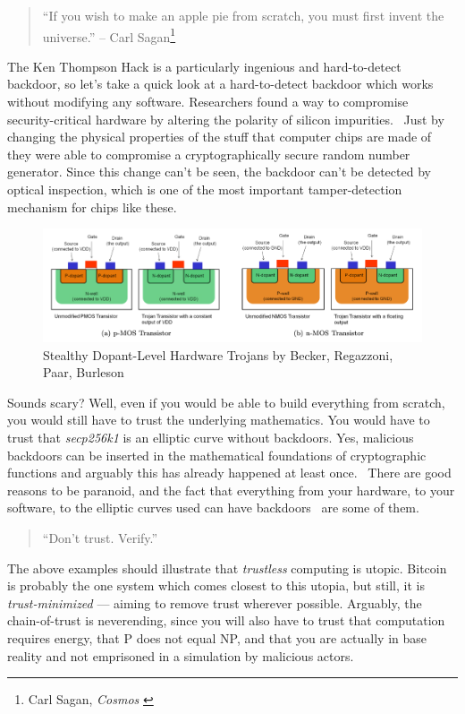 \begin{quotation}
``If you wish to make an apple pie from scratch, you must first invent
the universe.''
\flushright -- Carl Sagan\footnote{Carl Sagan, \textit{Cosmos} \cite{cosmos}}
\end{quotation}

The Ken Thompson Hack is a particularly ingenious and hard-to-detect backdoor,
so let's take a quick look at a hard-to-detect backdoor which works without
modifying any software. Researchers found a way to compromise security-critical
hardware by altering the polarity of silicon
impurities.~\cite{becker2013stealthy} Just by changing the physical properties
of the stuff that computer chips are made of they were able to compromise a
cryptographically secure random number generator. Since this change can't be
seen, the backdoor can't be detected by optical inspection, which is one of the
most important tamper-detection mechanism for chips like these.

\begin{figure}
  \includegraphics{assets/images/stealthy-hardware-trojan.png}
  \caption{Stealthy Dopant-Level Hardware Trojans by Becker, Regazzoni, Paar, Burleson}
  \label{fig:stealthy-hardware-trojan}
\end{figure}

Sounds scary? Well, even if you would be able to build everything from
scratch, you would still have to trust the underlying mathematics. You
would have to trust that \textit{secp256k1} is an elliptic curve without
backdoors. Yes, malicious backdoors can be inserted in the mathematical
foundations of cryptographic functions and arguably this has already
happened at least once.~\cite{wiki:Dual_EC_DRBG} There are good reasons to be paranoid, and the
fact that everything from your hardware, to your software, to the
elliptic curves used can have backdoors~\cite{wiki:backdoors} are some of them.

\begin{quotation}
``Don't trust. Verify.''
\end{quotation}

The above examples should illustrate that \textit{trustless} computing is
utopic. Bitcoin is probably the one system which comes closest to this
utopia, but still, it is \textit{trust-minimized} --- aiming to remove trust
wherever possible. Arguably, the chain-of-trust is neverending, since
you will also have to trust that computation requires energy, that P
does not equal NP, and that you are actually in base reality and not
emprisoned in a simulation by malicious actors.


